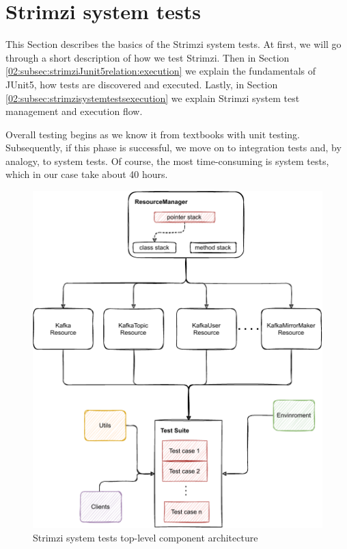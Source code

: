 \section{Strimzi system tests}
\label{02:sec:strimzisystemtests}

This Section describes the basics of the Strimzi system tests.
At first, we will go through a short description of how we test Strimzi.
Then in Section \ref{02:subsec:strimziJunit5relation:execution} we explain the fundamentals of JUnit5, how tests are discovered and executed. Lastly, in Section \ref{02:subsec:strimzisystemtestsexecution} we explain Strimzi system test management and execution flow.

Overall testing begins as we know it from textbooks with unit testing. Subsequently, if this phase is successful, we move on to integration tests and, by analogy, to system tests. Of course, the most time-consuming is system tests, which in our case take about 40 hours.
\begin{figure}[!ht]
    \centering
    \includegraphics[scale=0.80]{obrazky-figures/02-preliminaries/04-strimzi-system-tests/01-architecture-overall.pdf}
    \caption{Strimzi system tests top-level component architecture}
    \label{02d:fig:strimzisystemtestarch}
\end{figure}
